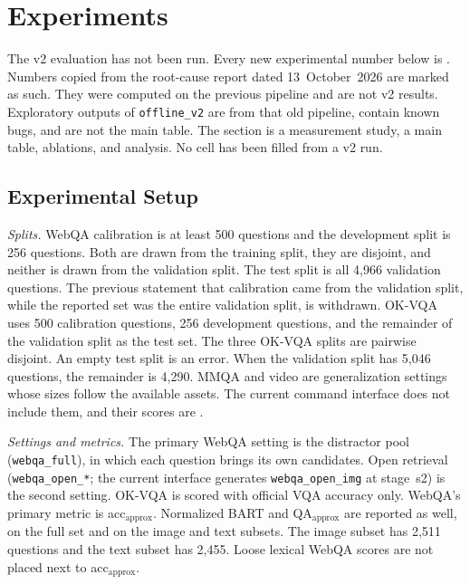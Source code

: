 \section{Experiments}
\label{sec:experiments}
The v2 evaluation has not been run.
Every new experimental number below is \ph{}.
Numbers copied from the root-cause report dated 13~October~2026 are marked as such.
They were computed on the previous pipeline and are not v2 results.
Exploratory outputs of \texttt{offline\_v2} are from that old pipeline, contain known bugs, and are not the main table.
The section is a measurement study, a main table, ablations, and analysis.
No cell has been filled from a v2 run.

\subsection{Experimental Setup}
\label{sec:setup}
\textit{Splits.}
WebQA calibration is at least 500 questions and the development split is 256 questions.
Both are drawn from the training split, they are disjoint, and neither is drawn from the validation split.
The test split is all 4{,}966 validation questions.
The previous statement that calibration came from the validation split, while the reported set was the entire validation split, is withdrawn.
OK-VQA uses 500 calibration questions, 256 development questions, and the remainder of the validation split as the test set.
The three OK-VQA splits are pairwise disjoint.
An empty test split is an error.
When the validation split has 5{,}046 questions, the remainder is 4{,}290.
MMQA and video are generalization settings whose sizes follow the available assets.
The current command interface does not include them, and their scores are \ph{}.

\textit{Settings and metrics.}
The primary WebQA setting is the distractor pool (\texttt{webqa\_full}), in which each question brings its own candidates.
Open retrieval (\texttt{webqa\_open\_*}; the current interface generates \texttt{webqa\_open\_img} at stage~s2) is the second setting.
OK-VQA is scored with official VQA accuracy only.
WebQA's primary metric is acc$_{\mathrm{approx}}$.
Normalized BART and QA$_{\mathrm{approx}}$ are reported as well, on the full set and on the image and text subsets.
The image subset has 2{,}511 questions and the text subset has 2{,}455.
Loose lexical WebQA scores are not placed next to acc$_{\mathrm{approx}}$.


